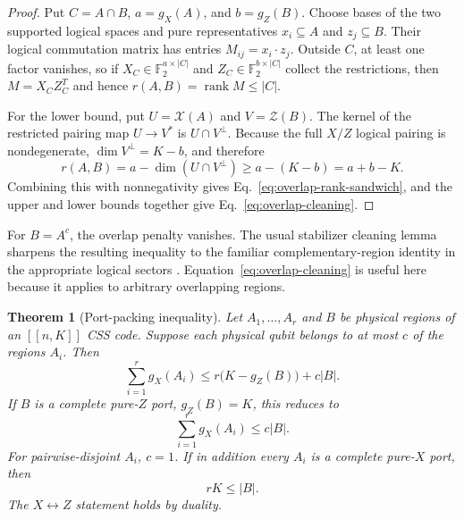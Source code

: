 \documentclass[aps,prx,reprint,superscriptaddress,nofootinbib,floatfix,longbibliography]{revtex4-2}
\newtheorem{theorem}{Theorem}[section]
\theoremstyle{definition}
\DeclareMathOperator{\rank}{rank}
\begin{document}
\begin{proof}
Put $C=A\cap B$, $a=g_X(A)$, and $b=g_Z(B)$.  Choose bases of the two
supported logical spaces and pure representatives $x_i\subseteq A$ and
$z_j\subseteq B$.  Their logical commutation matrix has entries
$M_{ij}=x_i\cdot z_j$.  Outside $C$, at least one factor vanishes, so if
$X_C\in\mathbb F_2^{a\times|C|}$ and
$Z_C\in\mathbb F_2^{b\times|C|}$ collect the restrictions, then
$M=X_CZ_C^T$ and hence $r(A,B)=\rank M\le|C|$.

For the lower bound, put $U=\mathcal X(A)$ and $V=\mathcal Z(B)$.  The kernel
of the restricted pairing map $U\to V^*$ is $U\cap V^\perp$.  Because the full
$X/Z$ logical pairing is nondegenerate, $\dim V^\perp=K-b$, and therefore
\begin{equation*}
 r(A,B)=a-\dim(U\cap V^\perp)\ge a-(K-b)=a+b-K.
\end{equation*}
Combining this with nonnegativity gives Eq.~\eqref{eq:overlap-rank-sandwich},
and the upper and lower bounds together give Eq.~\eqref{eq:overlap-cleaning}.
\end{proof}

For $B=A^c$, the overlap penalty vanishes.  The usual stabilizer cleaning lemma sharpens the resulting inequality to the familiar complementary-region identity in the appropriate logical sectors \cite{HaahPreskillTradeoff}.  Equation~\eqref{eq:overlap-cleaning} is useful here because it applies to arbitrary overlapping regions.

\begin{theorem}[Port-packing inequality]
\label{thm:port-packing}
Let $A_1,\ldots,A_r$ and $B$ be physical regions of an $[[n,K]]$ CSS code.  Suppose each physical qubit belongs to at most $c$ of the regions $A_i$.  Then
\begin{equation}
 \sum_{i=1}^r g_X(A_i)
 \le r\bigl(K-g_Z(B)\bigr)+c|B| .
 \label{eq:port-packing-general}
\end{equation}
If $B$ is a complete pure-$Z$ port, $g_Z(B)=K$, this reduces to
\begin{equation}
 \sum_{i=1}^r g_X(A_i)\le c|B| .
 \label{eq:port-packing-complete}
\end{equation}
For pairwise-disjoint $A_i$, $c=1$.  If in addition every $A_i$ is a complete pure-$X$ port, then
\begin{equation}
 rK\le |B| .
 \label{eq:port-packing-complete-ports}
\end{equation}
The $X\leftrightarrow Z$ statement holds by duality.
\end{theorem}
\end{document}
